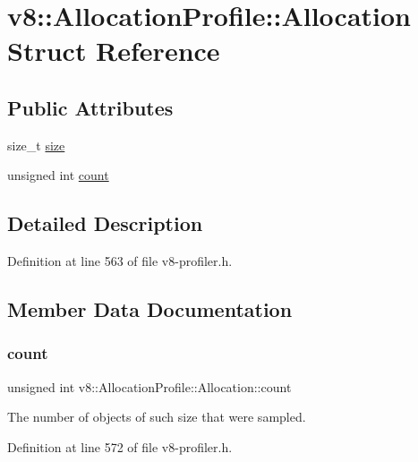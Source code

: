 \hypertarget{structv8_1_1AllocationProfile_1_1Allocation}{}\section{v8\+:\+:Allocation\+Profile\+:\+:Allocation Struct Reference}
\label{structv8_1_1AllocationProfile_1_1Allocation}
\subsection*{Public Attributes}
\begin{DoxyCompactItemize}
\item 
size\+\_\+t \mbox{\hyperlink{structv8_1_1AllocationProfile_1_1Allocation_a346410fa5dfb796dff396069897c0aba}{size}}
\item 
unsigned int \mbox{\hyperlink{structv8_1_1AllocationProfile_1_1Allocation_a012fe5238f5ebec039d7832f2d3ae8ed}{count}}
\end{DoxyCompactItemize}


\subsection{Detailed Description}


Definition at line 563 of file v8-\/profiler.\+h.



\subsection{Member Data Documentation}
\mbox{\label{structv8_1_1AllocationProfile_1_1Allocation_a012fe5238f5ebec039d7832f2d3ae8ed}} 
\subsubsection{\texorpdfstring{count}{count}}
{\footnotesize\ttfamily unsigned int v8\+::\+Allocation\+Profile\+::\+Allocation\+::count}

The number of objects of such size that were sampled. 

Definition at line 572 of file v8-\/profiler.\+h.

